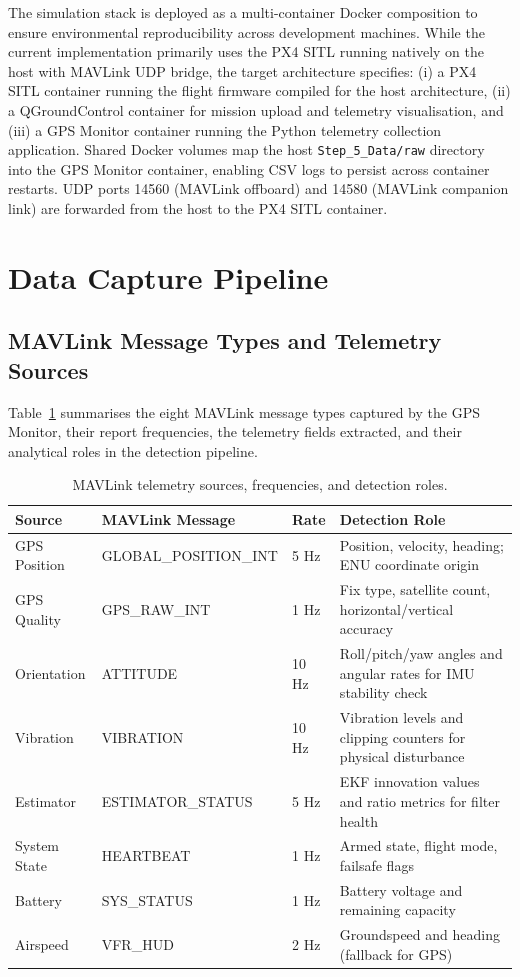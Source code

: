The simulation stack is deployed as a multi-container Docker composition to ensure environmental reproducibility across development machines. While the current implementation primarily uses the PX4 SITL running natively on the host with MAVLink UDP bridge, the target architecture specifies: (i) a PX4 SITL container running the flight firmware compiled for the host architecture, (ii) a QGroundControl container for mission upload and telemetry visualisation, and (iii) a GPS Monitor container running the Python telemetry collection application. Shared Docker volumes map the host \texttt{Step\_5\_Data/raw} directory into the GPS Monitor container, enabling CSV logs to persist across container restarts. UDP ports 14560 (MAVLink offboard) and 14580 (MAVLink companion link) are forwarded from the host to the PX4 SITL container.

\section{Data Capture Pipeline}

\subsection{MAVLink Message Types and Telemetry Sources}

Table~\ref{tab:data_sources} summarises the eight MAVLink message types captured by the GPS Monitor, their report frequencies, the telemetry fields extracted, and their analytical roles in the detection pipeline.

\begin{table}[H]
\centering
\caption{MAVLink telemetry sources, frequencies, and detection roles.}
\label{tab:data_sources}
\small
\begin{tabular}{@{}p{2.2cm}p{2.5cm}p{1.5cm}p{7.5cm}@{}}
\toprule
\textbf{Source} & \textbf{MAVLink Message} & \textbf{Rate} & \textbf{Detection Role} \\
\midrule
GPS Position & GLOBAL\_POSITION\_INT & 5 Hz & Position, velocity, heading; ENU coordinate origin \\
GPS Quality   & GPS\_RAW\_INT & 1 Hz & Fix type, satellite count, horizontal/vertical accuracy \\
Orientation   & ATTITUDE & 10 Hz & Roll/pitch/yaw angles and angular rates for IMU stability check \\
Vibration     & VIBRATION & 10 Hz & Vibration levels and clipping counters for physical disturbance \\
Estimator     & ESTIMATOR\_STATUS & 5 Hz & EKF innovation values and ratio metrics for filter health \\
System State  & HEARTBEAT & 1 Hz & Armed state, flight mode, failsafe flags \\
Battery       & SYS\_STATUS & 1 Hz & Battery voltage and remaining capacity \\
Airspeed      & VFR\_HUD & 2 Hz & Groundspeed and heading (fallback for GPS) \\
\bottomrule
\end{tabular}
\end{table}

